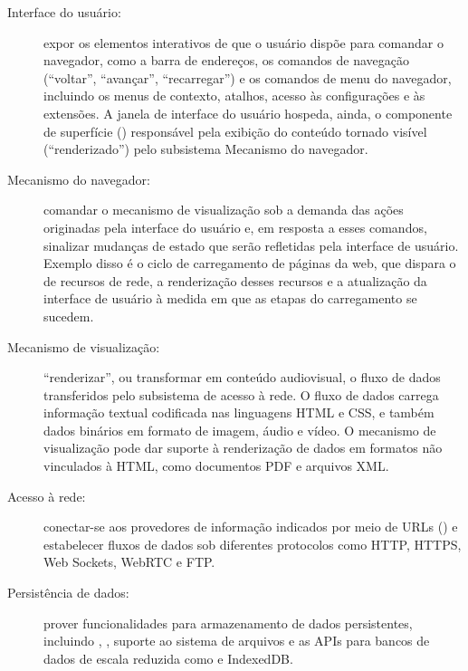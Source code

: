 \begin{quadro}[h]
	\begin{framed}{\small
	\begin{description}
		\item [Interface do usuário:] expor os elementos interativos de que o usuário dispõe para comandar o navegador, como a barra de endereços, os comandos de navegação (``voltar'', ``avançar'', ``recarregar'') e os comandos de menu do navegador, incluindo os menus de contexto, atalhos, acesso às configurações e às extensões. A janela de interface do usuário hospeda, ainda, o componente de superfície () responsável pela exibição do conteúdo tornado visível (``renderizado'') pelo subsistema Mecanismo do navegador.
		
		\item [Mecanismo do navegador:] comandar o mecanismo de visualização sob a demanda das ações originadas pela interface do usuário e, em resposta a esses comandos, sinalizar mudanças de estado que serão refletidas pela interface de usuário. Exemplo disso é o ciclo de carregamento de páginas da web, que dispara o  de recursos de rede, a renderização desses recursos e a atualização da interface de usuário à medida em que as etapas do carregamento se sucedem.
		
		\item [Mecanismo de visualização:] ``renderizar'', ou transformar em conteúdo audiovisual, o fluxo de dados transferidos pelo subsistema de acesso à rede. O fluxo de dados carrega informação textual codificada nas linguagens HTML e CSS, e também dados binários em formato de imagem, áudio e vídeo. O mecanismo de visualização pode dar suporte à renderização de dados em formatos não vinculados à HTML, como documentos PDF e arquivos XML.
		
		\item [Acesso à rede:] conectar-se aos provedores de informação indicados por meio de URLs () e estabelecer fluxos de dados sob diferentes protocolos como HTTP, HTTPS, Web Sockets, WebRTC e FTP.
		
		\item [Persistência de dados:] prover funcionalidades para armazenamento de dados persistentes, incluindo , , suporte ao sistema de arquivos e as APIs para bancos de dados de escala reduzida como  e IndexedDB.
		

\end{description}}
\end{framed}
\end{quadro}
